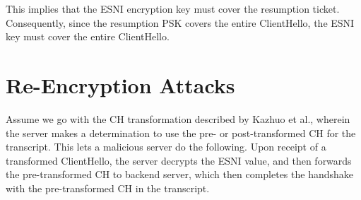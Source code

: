 \documentclass{article}
\begin{document}

This implies that the ESNI encryption key must cover the resumption ticket. Consequently, 
since the resumption PSK covers the entire ClientHello, the ESNI key must cover the entire
ClientHello.


\section{Re-Encryption Attacks}

Assume we go with the CH transformation described by Kazhuo et al., wherein the server makes a determination
to use the pre- or post-transformed CH for the transcript. This lets a malicious server do the following. 
Upon receipt of a transformed ClientHello, the server decrypts the ESNI value, and then forwards the pre-transformed
CH to backend server, which then completes the handshake with the pre-transformed CH in the transcript.





\end{document}
